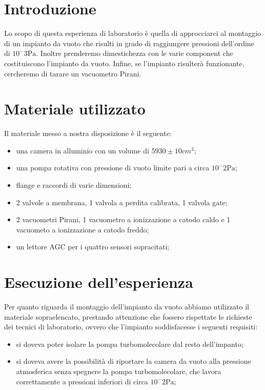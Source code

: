 \section{Introduzione}

Lo scopo di questa esperienza di laboratorio è quella di approcciarci al montaggio di un impianto da vuoto che risulti in grado di raggiungere pressioni dell'ordine di $10^-3 \si{\pascal}$. Inoltre prenderemo dimestichezza con le varie component che costituiscono l'impianto da vuoto. Infine, se l'impianto risulterà funzionante, cercheremo di tarare un vacuometro Pirani.

\section{Materiale utilizzato}

Il materiale messo a nostra disposizione è il seguente:

\begin{itemize}
	\item{una camera in alluminio con un volume di $5930 \pm 10 cm^3$;}
	\item{una pompa rotativa con pressione di vuoto limite pari a circa $10^-2 \si{\pascal}$;}
	\item{flange e raccordi di varie dimensioni;}
	\item{2 valvole a membrana, 1 valvola a perdita calibrata, 1 valvola gate;}
	\item{2 vacuometri Pirani, 1 vacuometro a ionizzazione a catodo caldo e 1 vacuometo a ionizzazione a catodo freddo;}
	\item{un lettore AGC per i quattro sensori sopracitati;}
\end{itemize}

\section{Esecuzione dell'esperienza}

Per quanto riguarda il montaggio dell'impianto da vuoto abbiamo utilizzato il materiale sopraelencato, prestando attenzione che fossero rispettate le richieste dei tecnici di laboratorio, ovvero che l'impianto soddisfacesse i seguenti requisiti:

\begin{itemize}
	\item{si doveva poter isolare la pompa turbomolecolare dal resto dell'impanto;}
	\item{si doveva avere la possibilità di riportare la camera da vuoto alla pressione atmosferica senza spegnere la pompa turbomolecolare, che lavora correttamente a pressioni inferiori di circa $10^-2 \si{\pascal}$;}
\end{itemize}

